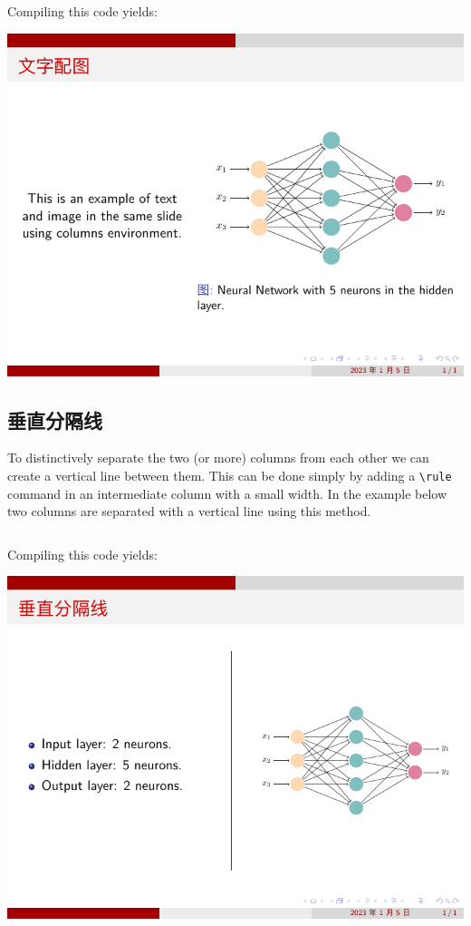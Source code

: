 Compiling this code yields:

\includegraphics{examples/beamer/beamercolumn02.pdf}

\subsection{垂直分隔线}

To distinctively separate the two (or more) columns from each other we can create a vertical line between them. This can be done simply by adding a \verb|\rule| command in an intermediate column with a small width. In the example below two columns are separated with a vertical line using this method.

\inputminted[linenos=true]{latex}{examples/beamer/beamercolumn03.tex}

Compiling this code yields:

\includegraphics{examples/beamer/beamercolumn03.pdf}

